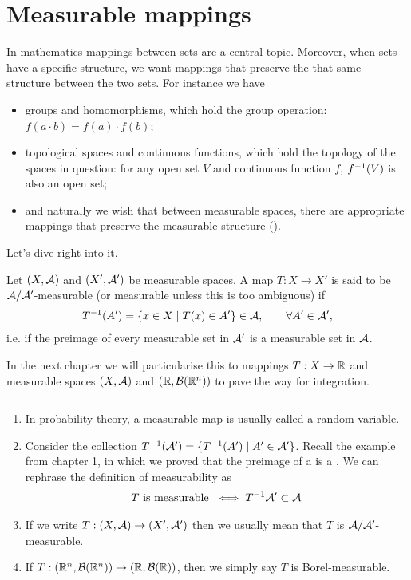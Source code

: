 
\chapter{Measurable mappings}

In mathematics mappings between sets are a central topic. Moreover, when sets have a specific structure, we want mappings that preserve the that same structure between the two sets. For instance we have
\begin{itemize}
	\item groups and homomorphisms, which hold the group operation: $f(a \cdot b) = f(a) \cdot f(b)$;
	\item topological spaces and continuous functions, which hold the topology of the spaces in question: for any open set $V$ and continuous function $f$, $f^{-1}(V)$ is also an open set;
	\item and naturally we wish that between measurable spaces, there are appropriate mappings that preserve the measurable structure (\siga).
\end{itemize}

Let's dive right into it.

\begin{dfn}
	Let $(X, \mathcal{A})$ and $(X', \mathcal{A}')$ be measurable spaces. A map $T : X \to X'$ is said to be $\mathcal{A}/\mathcal{A}'$-measurable (or measurable unless this is too ambiguous) if
	\begin{align*}
		T^{-1}(A') = \{x \in X \mid T(x) \in A'\} \in \mathcal{A},\qquad \forall A' \in \mathcal{A}',
	\end{align*}
	i.e. if the preimage of every measurable set in $\mathcal{A}'$ is a measurable set in $\mathcal{A}$.
\end{dfn}

In the next chapter we will particularise this to mappings $T:X \to \mathbb{R}$ and measurable spaces $(X, \mathcal{A})$ and $(\mathbb{R}, \mathcal{B}(\mathbb{R}^n))$ to pave the way for integration.

\begin{remark}$ $\newline
	\begin{enumerate}
		\item In probability theory, a measurable map is usually called a random variable.
		\item Consider the collection $T^{-1}(\mathcal{A}') = \{T^{-1}(A') \mid A' \in \mathcal{A}'\}$. Recall the example from chapter 1, in which we proved that the preimage of a \siga is a \siga. We can rephrase the definition of measurability as
		\begin{align*}
			T \text{ is measurable } \iff T^{-1}\mathcal{A}' \subset \mathcal{A}
		\end{align*}
		\item If we write $T: (X, \mathcal{A}) \to (X', \mathcal{A}')$ then we usually mean that $T$ is $\mathcal{A}/\mathcal{A}'$-measurable.
		
		\item If $T: (\mathbb{R}^n, \mathcal{B}(\mathbb{R}^n)) \to (\mathbb{R}, \mathcal{B}(\mathbb{R}))$, then we simply say $T$ is Borel-measurable.
	\end{enumerate}
\end{remark}

